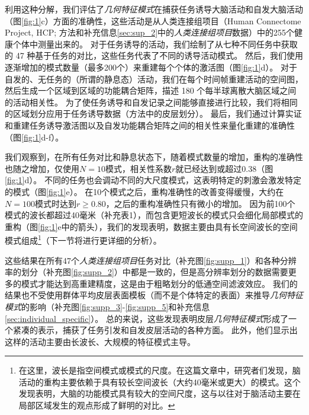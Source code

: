 \documentclass[lang=cn,a4paper,newtx]{elegantpaper}
\begin{document}
利用这种分解，我们评估了\textit{几何特征模式}在捕获任务诱导大脑活动和自发大脑活动（图\ref{fig:1}c）方面的准确性，这些活动是从人类连接组项目（Human Connectome Project, HCP; 方法和补充信息\ref{sec:sup_2}中的\textit{人类连接组项目}数据）中的255个健康个体中测量出来的。
对于任务诱导的活动，我们绘制了从七种不同任务中获取的 47 种基于任务的对比，这些任务代表了不同的诱导活动模式。
然后，我们使用逐渐增加的模式数量（最多200个）来重建每个个体的激活图（图\ref{fig:1}d）。
对于自发的、无任务的（所谓的静息态）活动，我们在每个时间帧重建活动的空间图，然后生成一个区域到区域的功能耦合矩阵，描述 180 个每半球离散大脑区域之间的活动相关性。
为了使任务诱导和自发记录之间能够直接进行比较，我们将相同的区域划分应用于任务诱导数据（方法中的皮层划分）。
最后，我们通过计算实证和重建任务诱导激活图以及自发功能耦合矩阵之间的相关性来量化重建的准确性（图\ref{fig:1}d-f）。


我们观察到，在所有任务对比和静息状态下，随着模式数量的增加，重构的准确性也随之增加，仅使用$ N=10 $模式，相关性系数$ r $就已经达到或超过0.38（图\ref{fig:1}d）。
不同的任务也会调动不同的大尺度模式，这表明特定的刺激会激发特定的模式（图\ref{fig:1}e）。
在10个模式之后，重构准确性的改善变得缓慢，大约在$ N=100 $模式时达到$ r \geq 0.80 $，之后的重构准确性只有微小的增加。
因为前100个模式的波长都超过40毫米（补充表1），而包含更短波长的模式只会细化局部模式的重构（图\ref{fig:1}e中的箭头），我们的发现表明，数据主要由具有长空间波长的空间模式组成\footnote{在这里，波长是指空间模式或模式的尺度。在这篇文章中，研究者们发现，脑活动的重构主要依赖于具有较长空间波长（大约40毫米或更大）的模式。这个发现表明，大脑的功能模式具有较大的空间尺度，这与以往对于脑活动主要在局部区域发生的观点形成了鲜明的对比。}（下一节将进行更详细的分析）。


这些结果在所有47个\textit{人类连接组项目}任务对比（补充图\ref{fig:supp_1}）和各种分辨率的划分（补充图\ref{fig:supp_2}）中都是一致的，但是高分辨率划分的数据需要更多的模式才能达到高重建精度，这是由于粗略划分的低通空间滤波效应。
我们的结果也不受使用群体平均皮层表面模板（而不是个体特定的表面）来推导\textit{几何特征模式}的影响（补充图\ref{fig:supp_3}-\ref{fig:supp_5}和补充信息\ref{sec:individual_specific}）。
总的来说，这些发现表明皮层\textit{几何特征模式}形成了一个紧凑的表示，捕获了任务引发和自发皮层活动的各种方面。
此外，他们显示出这样的活动主要由长波长、大规模的特征模式主导。
\end{document}
